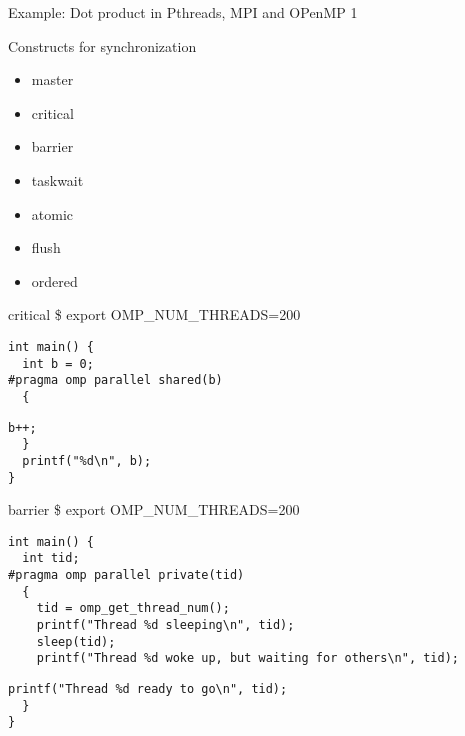 \documentclass[10pt]{beamer}
\begin{document}
\begin{frame}[fragile]{Example: Dot product in Pthreads, MPI and OPenMP}
1
\end{frame}

\begin{frame}{Constructs for synchronization}
\begin{itemize}
\item master
\item critical
\item barrier
\item taskwait
\item atomic
\item flush
\item ordered
\end{itemize}
\end{frame}

\begin{frame}[fragile]{critical}
\$ export OMP\_NUM\_THREADS=200
\begin{Verbatim}[fontsize=\small, formatcom=\color{red}]
int main() {        
  int b = 0;
#pragma omp parallel shared(b)
  {
\end{Verbatim}
\begin{Verbatim}[fontsize=\small, formatcom=\color{red}]
    b++;
  }
  printf("%d\n", b);
}
\end{Verbatim}
\end{frame}

\begin{frame}[fragile]{barrier}
\$ export OMP\_NUM\_THREADS=200
\begin{Verbatim}[fontsize=\small, formatcom=\color{red}]
int main() {
  int tid;
#pragma omp parallel private(tid)
  {
    tid = omp_get_thread_num();
    printf("Thread %d sleeping\n", tid);
    sleep(tid);
    printf("Thread %d woke up, but waiting for others\n", tid);
\end{Verbatim}
\begin{Verbatim}[fontsize=\small, formatcom=\color{red}]
    printf("Thread %d ready to go\n", tid);
  }
}
\end{Verbatim}
\end{frame}
\end{document}
